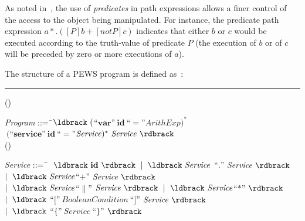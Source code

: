 \documentclass{sig-alternate}
\newcounter{regraA}
\newcommand{\regA}{(\theregraA) \addtocounter{regraA}{1}}
\begin{document}
As noted in~\cite{And79}, the use of \textit{predicates} in path expressions allows a 
finer control of the access to the object being manipulated. 
For instance, the predicate path expression $a*.([P] b + [not P] c)$  
indicates that  either $b$ or $c$  would be executed  according to the 
truth-value of predicate $P$ (the execution of $b$ or of $c$ will be 
preceded by zero or more executions of $a$). 


The structure of a PEWS program is defined as~\cite{BaCAM05}:\\
\hrule
% 


\begin{tabbing}

\regA \textit{Program} ::=\=  \ $\ldbrack\ ($``$\mathbf{var}$''$\ \mathbf{id}\
$``$=$''$ \mathit{ArithExp} )^* $\\ \>$ \ ($``$\mathbf{service}$''$\
\mathbf{id}\ $``$=$''$ \mathit{Service})^* \ \mathit{Service}\ \rdbrack$\\[1.5mm]
\regA \textit{Service} ::=\=  \ $\ 	\ \ldbrack\  \mathbf{id} \ \rdbrack\
                                              \mid\ \ldbrack\ \mathit{Service}\
                                              $``$.$''$\ \mathit{Service} \
                                              \rdbrack\ $\\ \>$
                                              \mid\ \ldbrack\
                                              \mathit{Service} $``$+$''$\ \mathit{Service} \ \rdbrack\ $\\ \>$ \mid\ \ldbrack\  \mathit{Service} $``$\|$''$\ \mathit{Service} \ \rdbrack\
                                              \mid\ \ldbrack\  \mathit{Service}$``$*$''$\ \rdbrack\ $\\ \>$
                                              \mid \ \ldbrack\ $``$[$''$\
                                              \mathit{BooleanCondition}\
                                              $``$]$''$ \ \mathit{Service} \ \rdbrack\ $\\ \>$
                                              \mid\ \ldbrack\ $``$\{$''$\  \mathit{Service}\ $``$\}$''$\ \rdbrack\ $ \\[-3mm]
\end{tabbing}
\end{document}
